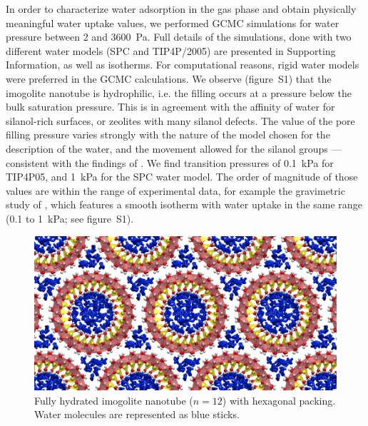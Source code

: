 \documentclass[thesis]{subfiles}
\begin{document}
In order to characterize water adsorption in the gas phase and obtain
physically meaningful water uptake values, we performed GCMC simulations for
water pressure between 2 and \SI{3600}{Pa}. Full details of the simulations, done with
two different water models (SPC and TIP4P/2005) are presented in Supporting
Information, as well as isotherms. For computational reasons, rigid water models
were preferred in the GCMC calculations. We observe (figure~S1) that the
imogolite nanotube is hydrophilic, i.e. the filling occurs at a pressure below
the bulk saturation pressure. This is in agreement with the affinity of
water for silanol-rich surfaces, or zeolites with many silanol
defects\cite{Coudert2009}. The value of the pore filling pressure varies
strongly with the nature of the model chosen for the description of the water,
and the movement allowed for the silanol groups --- consistent with the findings
of \citeauthor{Zang2010}\cite{Zang2010}. We find transition pressures of
\SI{0.1}{kPa} for TIP4P05, and \SI{1}{kPa} for the SPC water model. The order of magnitude
of those values are within the range of experimental data, for example the
gravimetric study of \citeauthor{Konduri2008}\cite{Konduri2008}, which features a
smooth isotherm with water uptake in the same range (0.1 to \SI{1}{kPa}; see
figure~S1).

\begin{figure}[ht]
	\centering
	\includegraphics[width=0.8\linewidth]{figures/images/imogolite-gcmc-result}
	\caption{Fully hydrated imogolite nanotube ($n=12$) with hexagonal packing. Water molecules are represented as blue sticks.}
    \label{fig:imogolite:gcmc-result}
\end{figure}

\begin{figure}[t]
    \centering
    
    \caption{\TODO}
    \label{fig:imogolite:isotherms}
\end{figure}
\end{document}
